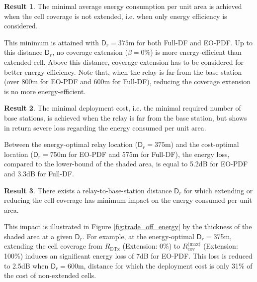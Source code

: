 \documentclass[journal]{IEEEtran}
\theoremstyle{definition}
\newtheorem{result}{Result}
\begin{document}
\vspace*{-5pt}\begin{result}
The minimal average energy consumption per unit area is achieved when the cell coverage is not extended, i.e. when only energy efficiency is considered.
\end{result} \vspace*{-5pt} \noindent
This minimum is attained with $\mathsf{D}_r=375$m for both Full-DF and EO-PDF. Up to this distance $\mathsf{D}_r$, no coverage extension ($\beta=0\%$) is more energy-efficient than extended cell. Above this distance, coverage extension has to be considered for better energy efficiency. Note that, when the relay is far from the base station (over 800m for EO-PDF and 600m for Full-DF), reducing the coverage extension is no more energy-efficient.

\vspace*{-5pt}\begin{result}
The minimal deployment cost, i.e. the minimal required number of base stations, is achieved when the relay is far from the base station, but shows in return severe loss regarding the energy consumed per unit area.
\end{result} \vspace*{-5pt} \noindent
Between the energy-optimal relay location ($\mathsf{D}_r=375$m) and the cost-optimal location ($\mathsf{D}_r=$750m for EO-PDF and 575m for Full-DF), the energy loss, compared to the lower-bound of the shaded area, is equal to 5.2dB for EO-PDF and 3.3dB for Full-DF.


\vspace*{-5pt}\begin{result}
There exists a relay-to-base-station distance $\mathsf{D}_r$ for which extending or reducing the cell coverage has minimum impact on the energy consumed per unit area.
\end{result} \vspace*{-5pt} \noindent
This impact is illustrated in Figure \ref{fig:trade_off_energy} by the thickness of the shaded area at a given $\mathsf{D}_r$. For example, at the energy-optimal $\mathsf{D}_r=$375m, extending the cell coverage from $R_{\text{DTx}}$ (Extension: 0\%) to $R_{\text{cov}}^{\text{(max)}}$ (Extension: 100\%) induces an significant energy loss of 7dB for EO-PDF. This loss is reduced to 2.5dB when $\mathsf{D}_r=$600m, distance for which the deployment cost is only 31\% of the cost of non-extended cells. 
\end{document}
